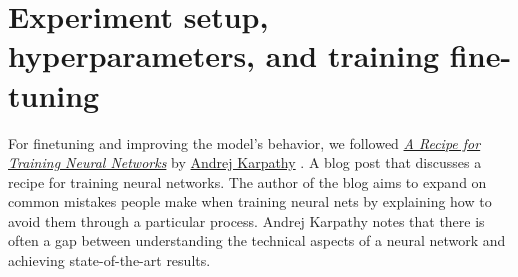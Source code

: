 \section{Experiment setup, hyperparameters, and training fine-tuning}



For finetuning and improving the model's behavior, we followed \href{http://karpathy.github.io/2019/04/25/recipe/}{\textit{A Recipe for Training Neural Networks}} \cite{AndrejKarpathyHttp://karpathy.github.io/2019/04/25/recipe/} by \href{https://karpathy.ai/}{Andrej Karpathy} \cite{AndrejKarpathyHttps://karpathy.ai/}. A blog post that discusses a recipe for training neural networks. The author of the blog aims to expand on common mistakes people make when training neural nets by explaining how to avoid them through a particular process. Andrej Karpathy notes that there is often a gap between understanding the technical aspects of a neural network and achieving state-of-the-art results.

